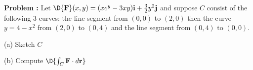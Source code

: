 {\bf Problem :} Let $\D {\bf F}(x,y) = (xe^{y}-3xy) {\bf i} + \frac{3}{2}y^2 {\bf j}$ and suppose \(C\) consist of the following 3 curves: the line segment from $(0,0)$ to $(2,0)$ then the curve $y=4-x^2$ from $(2,0)$ to $(0,4)$ and  the line segment from $(0,4)$ to $(0,0)$.

\vspace{0.1cm}

(a) \quad Sketch $C$

\vspace{0.01cm}

(b) \quad Compute \(\D{\int_C {\bf F}\cdot d{\bf r}}\)
